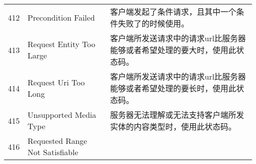 \begin{longtable}[]{@{}cll@{}}
\begin{minipage}[t]{0.32\columnwidth}
412\strut
\end{minipage} & \begin{minipage}[t]{0.30\columnwidth}\raggedright\strut
Precondition Failed\strut
\end{minipage} & \begin{minipage}[t]{0.30\columnwidth}\raggedright\strut
客户端发起了条件请求，且其中一个条件失败了的时候使用。\strut
\end{minipage}\tabularnewline
\begin{minipage}[t]{0.32\columnwidth}\centering\strut
413\strut
\end{minipage} & \begin{minipage}[t]{0.30\columnwidth}\raggedright\strut
Request Entity Too Large\strut
\end{minipage} & \begin{minipage}[t]{0.30\columnwidth}\raggedright\strut
客户端所发送请求中的请求url比服务器能够或者希望处理的要大时，使用此状态码。\strut
\end{minipage}\tabularnewline
\begin{minipage}[t]{0.32\columnwidth}\centering\strut
414\strut
\end{minipage} & \begin{minipage}[t]{0.30\columnwidth}\raggedright\strut
Request Uri Too Long\strut
\end{minipage} & \begin{minipage}[t]{0.30\columnwidth}\raggedright\strut
客户端所发送请求中的请求url比服务器能够或者希望处理的要长时，使用此状态码。\strut
\end{minipage}\tabularnewline
\begin{minipage}[t]{0.32\columnwidth}\centering\strut
415\strut
\end{minipage} & \begin{minipage}[t]{0.30\columnwidth}\raggedright\strut
Unsupported Media Type\strut
\end{minipage} & \begin{minipage}[t]{0.30\columnwidth}\raggedright\strut
服务器无法理解或无法支持客户端所发实体的内容类型时，使用此状态码。\strut
\end{minipage}\tabularnewline
\begin{minipage}[t]{0.32\columnwidth}\centering\strut
416\strut
\end{minipage} & \begin{minipage}[t]{0.30\columnwidth}\raggedright\strut
Requested Range Not Satisfiable\strut
\end{minipage} & \begin{minipage}[t]{0.30\columnwidth}\raggedright\strut

\end{minipage}
\end{longtable}
